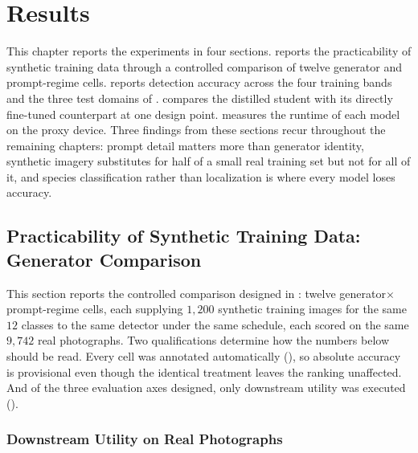 \newpage
\cleardoublepage
\chapter{Results}\label{chapter:results}

This chapter reports the experiments in four sections.  reports the practicability of synthetic training data through a controlled comparison of twelve generator and prompt-regime cells.  reports detection accuracy across the four training bands and the three test domains of .  compares the distilled student with its directly fine-tuned counterpart at one design point.  measures the runtime of each model on the proxy device. Three findings from these sections recur throughout the remaining chapters: prompt detail matters more than generator identity, synthetic imagery substitutes for half of a small real training set but not for all of it, and species classification rather than localization is where every model loses accuracy.

\section{Practicability of Synthetic Training Data: Generator Comparison}\label{sec:results_synthetic_data_practicability}

This section reports the controlled comparison designed in : twelve generator$\times$prompt-regime cells, each supplying $1{,}200$ synthetic training images for the same $12$ classes to the same detector under the same schedule, each scored on the same $9{,}742$ real photographs. Two qualifications determine how the numbers below should be read. Every cell was annotated automatically (), so absolute accuracy is provisional even though the identical treatment leaves the ranking unaffected. And of the three evaluation axes designed, only downstream utility was executed ().

\subsection{Downstream Utility on Real Photographs}\label{sec:results_downstream_utility}

